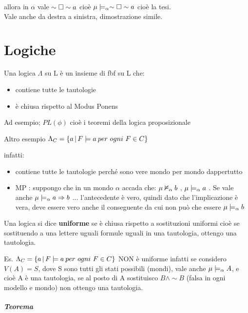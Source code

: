 allora in $\alpha$ vale $\sim\square\sim a$ cioè $\mu\models_{\alpha}\sim\square\sim a$
cioè la tesi. \\


Vale anche da destra a sinistra, dimostrazione simile. \\



\section{Logiche}

Una logica $\Lambda$ su L è un insieme di fbf su L che: 
\begin{itemize}
\item contiene tutte le tautologie 
\item è chiusa rispetto al Modus Ponens 
\end{itemize}
Ad esempio; $PL(\phi)$ cioè i teoremi della logica proposizionale

Altro esempio $\Lambda_{C}=\{a\,|\,\vera F{a\: per}\ ogni\ F\in C\}$

infatti: 
\begin{itemize}
\item contiene tutte le tautologie perché sono vere mondo per mondo dappertutto 
\item MP : suppongo che in un mondo $\alpha$ accada che: $\mu\nvDash_{\alpha}b$
, $\mu\models_{\alpha}a$ . Se vale anche $\mu\models_{\alpha}a\Rightarrow b$
... l'antecedente è vero, quindi dato che l'implicazione è vera, deve
essere vero anche il conseguente da cui non può che essere $\mu\models_{\alpha}b$ 
\end{itemize}
Una logica si dice \textbf{uniforme }se è chiusa rispetto a sostituzioni
uniformi cioè se sostituendo a una lettere uguali formule uguali in
una tautologia, ottengo una tautologia.

Es. $\Lambda_{C}=\{a\,|\,\vera F{a\: per}\ ogni\ F\in C\}$ NON è
uniforme infatti se considero $V(A)=S$, dove S sono tutti gli stati
possibili (mondi), vale anche $\mu\models_{\alpha}A$, e cioè A è
una tautologia, se al posto di A sostituisco $B\wedge\sim B$ (falsa
in ogni modello e mondo) non ottengo una tautologia.\\
\\


\textbf{\emph{\large{{Teorema}}}}{\large \par}

